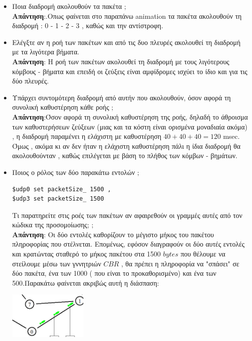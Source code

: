 \documentclass{article}%
\begin{document}
\begin{itemize}
\item Ποια διαδρομή ακολουθούν τα πακέτα $;$\\ 
\textbf{Απάντηση}:.Οπως φαίνεται στο παραπάνω \textlatin{animation} τα πακέτα ακολουθούν τη διαδρομή : 0 - 1 - 2 - 3 , καθώς και την αντίστροφη. 
\item Ελέγξτε αν η ροή των πακέτων και από τις δυο πλευρές ακολουθεί τη διαδρομή με τα
λιγότερα βήματα. \\
\textbf{Απάντηση}: Η ροή των πακέτων ακολουθεί τη διαδρομή με τους λιγότερους κόμβους - βήματα και επειδή οι ζεύξεις είναι αμφίδρομες ισχύει το ίδιο και για τις δύο πλευρές.
\item Υπάρχει συντομότερη διαδρομή από αυτήν που ακολουθούν, όσον αφορά τη συνολική
καθυστέρηση κάθε ροής $;$\\ 
\textbf{Απάντηση}:Όσον αφορά τη συνολική καθυστέρηση της ροής, δηλαδή το άθροισμα των καθυστερήσεων ζεύξεων (μιας και τα κόστη είναι ορισμένα μοναδιαία ακόμα) , η διαδρομή παραμένει η ελάχιστη με καθυστέρηση $40+40+40=120$ \textlatin{msec}. Όμως , ακόμα κι αν δεν ήταν η ελάχιστη καθυστέρηση πάλι η ίδια διαδρομή θα ακολουθούνταν , καθώς επιλέγεται με βάση το πλήθος των κόμβων - βημάτων.\\
\item Ποιος ο ρόλος των δύο παρακάτω εντολών $;$
 \begin{verbatim}$udp0 set packetSize_ 1500 ,
$udp3 set packetSize_ 1500 \end{verbatim}  Τι παρατηρείτε στις ροές των πακέτων αν αφαιρεθούν οι γραμμές
αυτές από τον κώδικα της προσομοίωσης;  $;$ \\
\textbf{Απάντηση}:  Οι δύο εντολές καθορίζουν το μέγιστο μήκος του πακέτου πληροφορίας που στέλνεται. Επομένως, εφόσον διαγραφούν οι δύο αυτές εντολές και κρατώντας σταθερό το μήκος πακέτου στα 1500 $bytes$ που θέλουμε να στείλουμε μέσω των γννητριών $CBR$ , θα πρέπει η πληροφορία να "σπάσει" σε δύο πακέτα, ένα των 1000 ( που είναι το προκαθορισμένο) και ένα των 500.Παρακάτω φαίνεται ακριβώς αυτή η διάσπαση:
\begin{center}
	\includegraphics[width=0.30\textwidth]{2.png}
\end{center}

\end{itemize}
\end{document}
